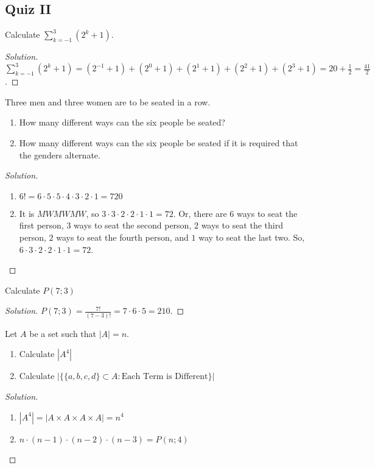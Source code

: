     \subsection{Quiz II}
    \begin{problem}
    Calculate $\sum_{k=-1}^{3} (2^k+1)$.
    \end{problem}
    \begin{proof}[Solution]
    \vspace{-0.5\topsep}
    $\sum_{k=-1}^{3}(2^k+1) = (2^{-1}+1) + (2^0+1) + (2^1+1)+(2^2+1) + (2^3+1) = 20 +\frac{1}{2} = \frac{41}{2}$.
    \end{proof}
    \begin{problem}
    Three men and three women are to be seated in a row.
    \begin{enumerate}
        \item How many different ways can the six people be seated?
        \item How many different ways can the six people be seated if it is required that the genders alternate.
    \end{enumerate}
    \end{problem}
    \begin{proof}[Solution]
    \vspace{-\topsep}
    \
    \begin{enumerate}
        \item $6! = 6\cdot 5 \cdot 5 \cdot 4 \cdot 3 \cdot 2 \cdot 1 = 720$
        \item It is $MWMWMW$, so $3\cdot 3 \cdot 2 \cdot 2 \cdot 1 \cdot 1 = 72$. Or, there are $6$ ways to seat the first person, $3$ ways to seat the second person, $2$ ways to seat the third person, $2$ ways to seat the fourth person, and $1$ way to seat the last two. So, $6\cdot 3 \cdot 2 \cdot 2 \cdot 1 \cdot 1 = 72$.
    \end{enumerate}
    \end{proof}
    \begin{problem}
    Calculate $P(7;3)$
    \end{problem}
    \begin{proof}[Solution]
    \vspace{-0.5\topsep}
    $P(7;3) = \frac{7!}{(7-3)!} = 7\cdot 6 \cdot 5 = 210$.
    \end{proof}
    \begin{problem}
    Let $A$ be a set such that $|A| = n$.
    \begin{enumerate}
        \item Calculate $|A^4|$
        \item Calculate $|\{\{a,b,c,d\}\subset A:\textrm{Each Term is Different}\}|$
    \end{enumerate}
    \end{problem}
    \begin{proof}[Solution]
    \par
    \begin{enumerate}
        \item $|A^4| = |A\times A \times A \times A| = n^4$
        \item $n \cdot (n-1)\cdot (n-2)\cdot (n-3) = P(n;4)$
    \end{enumerate}
    \end{proof}
